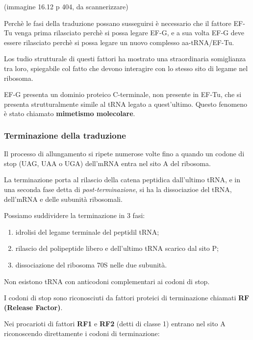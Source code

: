 \documentclass[]{article}
\begin{document}
(immagine 16.12 p 404, da scannerizzare)

Perchè le fasi della traduzione possano susseguirsi è necessario che il
fattore EF-Tu venga prima rilasciato perchè si possa legare EF-G, e a
sua volta EF-G deve essere rilasciato perchè si possa legare un nuovo
complesso aa-tRNA/EF-Tu.

Los tudio strutturale di questi fattori ha mostrato una straordinaria
somiglianza tra loro, spiegabile col fatto che devono interagire con lo
stesso sito di legame nel ribosoma.

EF-G presenta un dominio proteico C-terminale, non presente in EF-Tu,
che si presenta strutturalmente simile al tRNA legato a quest'ultimo.
Questo fenomeno è stato chiamato \textbf{mimetismo molecolare}.

\subsubsection{Terminazione della
traduzione}\label{terminazione-della-traduzione}

Il processo di allungamento si ripete numerose volte fino a quando un
codone di stop (UAG, UAA o UGA) dell'mRNA entra nel sito A del ribosoma.

La terminazione porta al rilascio della catena peptidica dall'ultimo
tRNA, e in una seconda fase detta di \emph{post-terminazione}, si ha la
dissociazioe del tRNA, dell'mRNA e delle subunità ribosomali.

Possiamo suddividere la terminazione in 3 fasi:

\begin{enumerate}
\def\labelenumi{\arabic{enumi}.}
\itemsep1pt\parskip0pt
\item
  idrolisi del legame terminale del peptidil tRNA;
\item
  rilascio del polipeptide libero e dell'ultimo tRNA scarico dal sito P;
\item
  dissociazione del ribosoma 70S nelle due subunità.
\end{enumerate}

Non esistono tRNA con anticodoni complementari ai codoni di stop.

I codoni di stop sono riconosciuti da fattori proteici di terminazione
chiamati \textbf{RF (Release Factor)}.

Nei procarioti di fattori \textbf{RF1} e \textbf{RF2} (detti di classe
1) entrano nel sito A riconoscendo direttamente i codoni di
terminazione:
\end{document}
